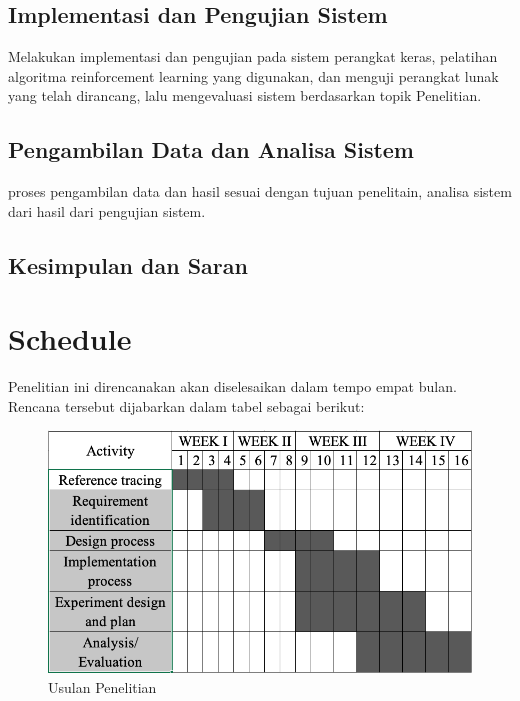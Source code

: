 \subsection{Implementasi dan Pengujian Sistem}
Melakukan implementasi dan pengujian pada sistem perangkat keras,
pelatihan algoritma reinforcement learning yang digunakan, 
dan menguji perangkat lunak yang telah dirancang, lalu mengevaluasi sistem
berdasarkan topik Penelitian.


\subsection{Pengambilan Data dan Analisa Sistem}
proses pengambilan data dan hasil sesuai dengan tujuan penelitain,
analisa sistem dari hasil dari pengujian sistem.
\subsection{Kesimpulan dan Saran}

\section{Schedule}


Penelitian ini direncanakan akan diselesaikan dalam tempo empat bulan. Rencana tersebut dijabarkan dalam tabel sebagai berikut:








\begin{figure}[H]
	\centering
	\includegraphics[width=0.9\linewidth]{figure/Chart-ThesisQ.png}
	\caption{Usulan Penelitian}
	\label{fig:chart-thesisq}
\end{figure}


